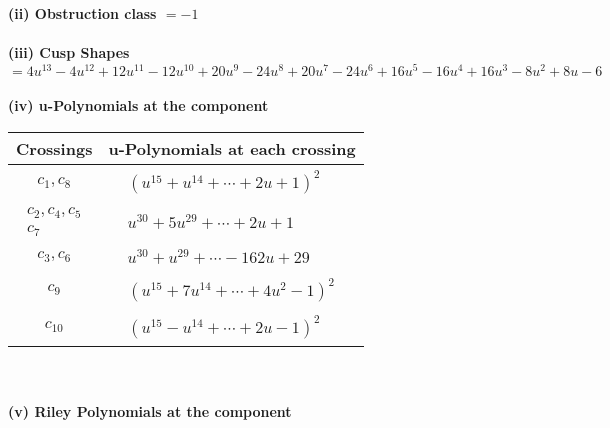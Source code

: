 \documentclass[1p]{elsarticle_modified}
\theoremstyle{definition}
\begin{document}
\flushleft \textbf{(ii) Obstruction class $= -1$}\\~\\
\flushleft \textbf{(iii) Cusp Shapes $= 4 u^{13}-4 u^{12}+12 u^{11}-12 u^{10}+20 u^9-24 u^8+20 u^7-24 u^6+16 u^5-16 u^4+16 u^3-8 u^2+8 u-6$}\\~\\
\newpage\renewcommand{\arraystretch}{1}
\flushleft \textbf{(iv) u-Polynomials at the component}\newline \\
\begin{tabular}{m{50pt}|m{274pt}}
Crossings & \hspace{64pt}u-Polynomials at each crossing \\
\hline $$\begin{aligned}c_{1},c_{8}\end{aligned}$$&$\begin{aligned}
&(u^{15}+u^{14}+\cdots+2 u+1)^{2}
\end{aligned}$\\
\hline $$\begin{aligned}c_{2},c_{4},c_{5}\\c_{7}\end{aligned}$$&$\begin{aligned}
&u^{30}+5 u^{29}+\cdots+2 u+1
\end{aligned}$\\
\hline $$\begin{aligned}c_{3},c_{6}\end{aligned}$$&$\begin{aligned}
&u^{30}+u^{29}+\cdots-162 u+29
\end{aligned}$\\
\hline $$\begin{aligned}c_{9}\end{aligned}$$&$\begin{aligned}
&(u^{15}+7 u^{14}+\cdots+4 u^2-1)^{2}
\end{aligned}$\\
\hline $$\begin{aligned}c_{10}\end{aligned}$$&$\begin{aligned}
&(u^{15}- u^{14}+\cdots+2 u-1)^{2}
\end{aligned}$\\
\hline
\end{tabular}\\~\\
\newpage\renewcommand{\arraystretch}{1}
\flushleft \textbf{(v) Riley Polynomials at the component}\newline \\
\end{document}
